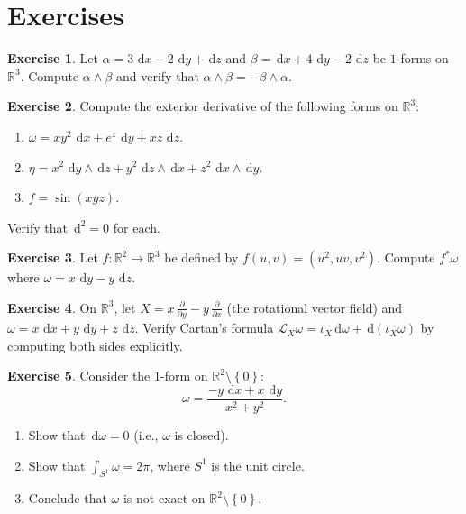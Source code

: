 \documentclass[12pt,a4paper,openany]{book}
\theoremstyle{definition}
\newtheorem{exercise}{Exercise}[chapter]
\theoremstyle{remark}
\newcommand{\R}{\mathbb{R}}
\newcommand{\dd}{\,\mathrm{d}}
\newcommand{\set}[1]{\left\{ #1 \right\}}
\begin{document}
\section{Exercises}\label{sec:exercises-forms}

\begin{exercise}\label{exo:wedge-computation}
Let $\alpha = 3\,\dd x - 2\,\dd y + \dd z$ and
$\beta = \dd x + 4\,\dd y - 2\,\dd z$ be $1$-forms on $\R^3$.
Compute $\alpha \wedge \beta$ and verify that
$\alpha \wedge \beta = -\beta \wedge \alpha$.
\end{exercise}

\begin{exercise}\label{exo:exterior-derivative-computation}
Compute the exterior derivative of the following forms on $\R^3$:
\begin{enumerate}[label=(\alph*)]
  \item $\omega = xy^2\,\dd x + e^z\,\dd y + xz\,\dd z$.
  \item $\eta = x^2\,\dd y \wedge \dd z + y^2\,\dd z \wedge \dd x
    + z^2\,\dd x \wedge \dd y$.
  \item $f = \sin(xyz)$.
\end{enumerate}
Verify that $\dd^2 = 0$ for each.
\end{exercise}

\begin{exercise}\label{exo:pullback-computation}
Let $f \colon \R^2 \to \R^3$ be defined by
$f(u,v) = (u^2, uv, v^2)$. Compute $f^*\omega$ where
$\omega = x\,\dd y - y\,\dd z$.
\end{exercise}

\begin{exercise}\label{exo:cartan-formula-verification}
On $\R^3$, let $X = x\,\frac{\partial}{\partial y}
- y\,\frac{\partial}{\partial x}$ (the rotational vector field) and
$\omega = x\,\dd x + y\,\dd y + z\,\dd z$. Verify Cartan's formula
$\mathcal{L}_X \omega = \iota_X \dd\omega + \dd(\iota_X \omega)$
by computing both sides explicitly.
\end{exercise}

\begin{exercise}\label{exo:closed-not-exact}
Consider the $1$-form on $\R^2 \setminus \set{0}$:
\[
  \omega = \frac{-y\,\dd x + x\,\dd y}{x^2 + y^2}.
\]
\begin{enumerate}[label=(\alph*)]
  \item Show that $\dd\omega = 0$ (i.e., $\omega$ is closed).
  \item Show that $\int_{S^1} \omega = 2\pi$, where $S^1$ is the unit circle.
  \item Conclude that $\omega$ is not exact on $\R^2 \setminus \set{0}$.
\end{enumerate}
\end{exercise}
\end{document}
